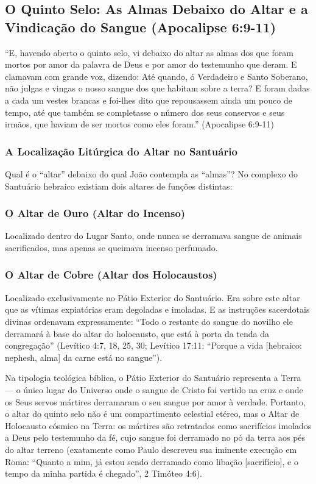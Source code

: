 \subsection{O Quinto Selo: As Almas Debaixo do Altar e a Vindicação do Sangue (Apocalipse 6:9-11)}


``E, havendo aberto o quinto selo, vi debaixo do altar as almas dos que foram mortos por amor da palavra de Deus e por amor do testemunho que deram. E clamavam com grande voz, dizendo: Até quando, ó Verdadeiro e Santo Soberano, não julgas e vingas o nosso sangue dos que habitam sobre a terra? E foram dadas a cada um vestes brancas e foi-lhes dito que repousassem ainda um pouco de tempo, até que também se completasse o número dos seus conservos e seus irmãos, que haviam de ser mortos como eles foram.'' (Apocalipse 6:9-11)


\subsubsection*{A Localização Litúrgica do Altar no Santuário}
Qual é o ``altar'' debaixo do qual João contempla as ``almas''? No complexo do Santuário hebraico existiam dois altares de funções distintas:

\subsubsection*{O Altar de Ouro (Altar do Incenso)}
Localizado dentro do Lugar Santo, onde nunca se derramava sangue de animais sacrificados, mas apenas se queimava incenso perfumado.

\subsubsection*{O Altar de Cobre (Altar dos Holocaustos)}
Localizado exclusivamente no Pátio Exterior do Santuário. Era sobre este altar que as vítimas expiatórias eram degoladas e imoladas. E as instruções sacerdotais divinas ordenavam expressamente: ``Todo o restante do sangue do novilho ele derramará à base do altar do holocausto, que está à porta da tenda da congregação'' (Levítico 4:7, 18, 25, 30; Levítico 17:11: ``Porque a vida [hebraico: nephesh, alma] da carne está no sangue'').

Na tipologia teológica bíblica, o Pátio Exterior do Santuário representa a Terra — o único lugar do Universo onde o sangue de Cristo foi vertido na cruz e onde os Seus servos mártires derramaram o seu sangue por amor à verdade. Portanto, o altar do quinto selo não é um compartimento celestial etéreo, mas o Altar de Holocausto cósmico na Terra: os mártires são retratados como sacrifícios imolados a Deus pelo testemunho da fé, cujo sangue foi derramado no pó da terra aos pés do altar terreno (exatamente como Paulo descreveu sua iminente execução em Roma: ``Quanto a mim, já estou sendo derramado como libação [sacrifício], e o tempo da minha partida é chegado'', 2 Timóteo 4:6).


